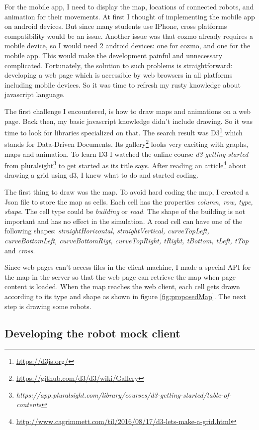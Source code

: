 \documentclass[12pt,a4paper]{article}
\begin{document}
For the mobile app, I need to display the map, locations of connected robots, and animation for their movements. At first I thought of implementing the mobile app on android devices. But since many students use IPhone, cross platforms compatibility would be an issue.  Another issue was that cozmo already requires a mobile device, so I would need 2 android devices: one for cozmo, and one for the mobile app. This would make the development painful and unnecessary complicated. Fortunately,  the solution to such problems is straightforward: developing a web page which is accessible by web browsers in all platforms including mobile devices. So it was time to refresh my rusty knowledge about javascript language. 


The first challenge I encountered, is how to draw maps and animations on a web page. Back then, my  basic javascript knowledge  didn't include drawing. So it was time  to look for libraries specialized on that. The search result was D3\footnote{\url{https://d3js.org/}} which stands for Data-Driven Documents. Its gallery\footnote{\url{https://github.com/d3/d3/wiki/Gallery}} looks very exciting with graphs, maps and animation. To learn D3 I watched the online course \textit{d3-getting-started} from pluralsight\footnote{\textit{https://app.pluralsight.com/library/courses/d3-getting-started/table-of-contents}} to get started as its title says. After reading an article\footnote{\url{http://www.cagrimmett.com/til/2016/08/17/d3-lets-make-a-grid.html}} about drawing a grid using d3, I knew what to do and started coding. 


The first thing to draw was the map. To avoid hard coding the map, I created a Json file to store the map as cells. Each cell has the properties \textit{column, row, type, shape}. The cell type could be \textit{building} or \textit{road}. The shape of the building is not important and has no effect in the simulation. A road cell can have one of the following shapes: \textit{straightHorizontal, straightVertical, curveTopLeft, curveBottomLeft, curveBottomRigt, curveTopRight, tRight, tBottom, tLeft, tTop} and \textit{cross}.

Since web pages can't access files in the client machine, I made a special API for the map in the server so that the web page can retrieve the map when page content is loaded. When the map reaches the web client, each cell gets drawn according to its type and shape as shown in figure \ref{fig:proposedMap}. The next step is drawing some robots. 

\subsection{Developing the robot mock client}
\end{document}
